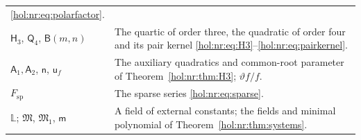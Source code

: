 \documentclass[11pt]{article}
\numberwithin{equation}{section}
\theoremstyle{definition}
\theoremstyle{remark}
\begin{document}
\begin{center}
\begin{tabularx}{\textwidth}{@{}l X@{}}
\eqref{hol:nr:eq:polarfactor}.\\
$\mathsf H_3$, $\mathsf Q_4$, $\mathsf B(m,n)$ & The quartic of order three,
the quadratic of order four and its pair kernel
\eqref{hol:nr:eq:H3}--\eqref{hol:nr:eq:pairkernel}.\\
$\mathsf A_1,\mathsf A_2$, $\mathsf n$, $\mathsf u_f$ & The auxiliary quadratics
and common-root parameter of Theorem~\ref{hol:nr:thm:H3};
$\vartheta f/f$.\\
$F_{\mathrm{sp}}$ & The sparse series \eqref{hol:nr:eq:sparse}.\\
$\mathbb L$; $\mathfrak M$, $\mathfrak M_1$, $\mathsf m$ & A field of external
constants; the fields and minimal polynomial of
Theorem~\ref{hol:nr:thm:systems}.\\
\bottomrule
\end{tabularx}
\end{center}
\end{document}
